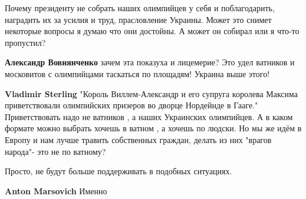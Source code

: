 \begin{itemize}
Почему президенту не собрать наших олимпийцев у себя и поблагодарить, наградить
их за усилия и труд, прасловление Украины. Может это снимет некоторые вопросы я
думаю что они достойны. А может он собирал или я что-то пропустил?

\begin{itemize}
 
\textbf{Александр Вовнянченко} зачем эта показуха и лицемерие? Это удел
ватников и московитов с олимпийцами таскаться по площадям! Украина выше этого!

 
\textbf{Vladimir Sterling} "Король Виллем-Александр и его супруга королева
Максима приветствовали олимпийских призеров во дворце Нордейнде в Гааге."
Приветствовать надо не ватников , а наших Украинских олимпийцев. А в каком
формате можно выбрать хочешь в ватном , а хочешь по людски. Но мы же идём в
Европу и нам лучше травить собственных граждан, делать из них "врагов народа"-
это не по ватному?
\end{itemize}

 
Просто, не будут больше поддерживать в подобных ситуациях.

\begin{itemize}
 

\textbf{Anton Marsovich}
Именно

 

\end{itemize}
\end{itemize}
